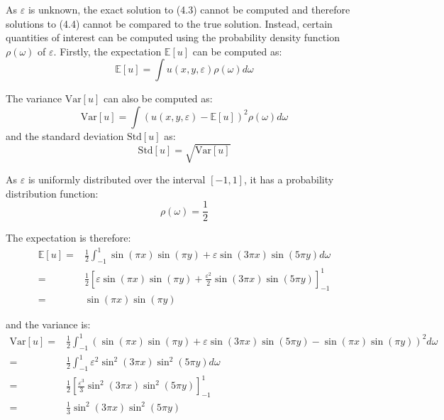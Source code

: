 \documentclass{article}
\numberwithin{equation}{section}
\begin{document}
As $\varepsilon$ is unknown, the exact solution to (4.3) cannot be computed and therefore solutions to (4.4) cannot be compared to the true solution. Instead, certain quantities of interest can be computed using the probability density function $\rho(\omega)$ of $\varepsilon$. Firstly, the expectation $\mathbb{E}[u]$ can be computed as:
\begin{equation}
\mathbb{E}[u] = \int u(x,y,\varepsilon) \rho(\omega) d \omega
\end{equation}

The variance $\text{Var}[u]$ can also be computed as:
\begin{equation}
\text{Var}[u] = \int \left(u(x,y,\varepsilon) - \mathbb{E}[u] \right)^2 \rho(\omega) d \omega
\end{equation}
and the standard deviation $\text{Std}[u]$ as:
\begin{equation}
\text{Std}[u] = \sqrt{\text{Var}[u]}
\end{equation}

As $\varepsilon$ is uniformly distributed over the interval $[-1,1]$, it has a probability distribution function:
\begin{equation}
\rho(\omega) = \frac{1}{2}
\end{equation}

The expectation is therefore:
\begin{equation}
\begin{split}
\mathbb{E}[u] = & \frac{1}{2} \int_{-1}^1 \sin(\pi x)\sin(\pi y) + \varepsilon \sin(3 \pi x) \sin(5 \pi y) d \omega \\
= & \frac{1}{2} \left[\varepsilon \sin(\pi x) \sin(\pi y) + \frac{\varepsilon^2}{2} \sin(3 \pi x) \sin(5 \pi y)\right]_{-1}^{1} \\
= & \sin(\pi x) \sin(\pi y)
\end{split}
\end{equation}

and the variance is:
\begin{equation}
\begin{split}
\text{Var}[u] = & \frac{1}{2} \int_{-1}^1 (\sin(\pi x) \sin(\pi y) + \varepsilon \sin(3 \pi x) \sin(5 \pi y) - \sin(\pi x) \sin(\pi y))^2 d \omega \\
= & \frac{1}{2} \int_{-1}^1 \varepsilon^2 \sin^2 (3 \pi x) \sin^2 (5 \pi y) d \omega \\
= & \frac{1}{2} \left[ \frac{\varepsilon^3}{3} \sin^2 (3 \pi x) \sin^2 (5 \pi y) \right]_{-1}^1 \\
= & \frac{1}{3} \sin^2 (3 \pi x) \sin^2 (5 \pi y)
\end{split}
\end{equation}
\end{document}
